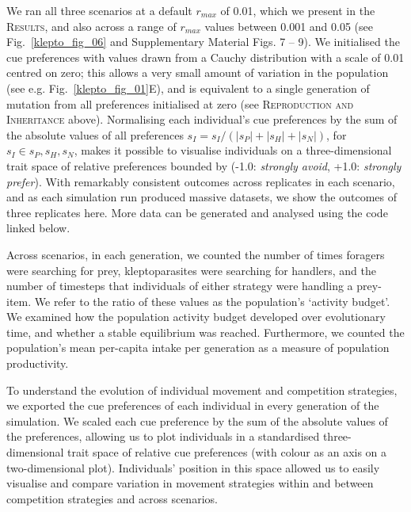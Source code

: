 We ran all three scenarios at a default $r_{max}$ of 0.01, which we present in the \textsc{Results}, and also across a range of $r_{max}$ values between 0.001 and 0.05 (see Fig.~\ref{klepto_fig_06} and Supplementary Material Figs. 7 -- 9).
We initialised the cue preferences with values drawn from a Cauchy distribution with a scale of 0.01 centred on zero; this allows a very small amount of variation in the population (see e.g. Fig.~\ref{klepto_fig_01}E), and is equivalent to a single generation of mutation from all preferences initialised at zero (see \textsc{Reproduction and Inheritance} above).
Normalising each individual's cue preferences by the sum of the absolute values of all preferences $s_I = s_I / (|s_P| + |s_H| + |s_N|)$, for $s_I \in s_P, s_H, s_N$, makes it possible to visualise individuals on a three-dimensional trait space of relative preferences bounded by (-1.0: \textit{strongly avoid}, +1.0: \textit{strongly prefer}).
With remarkably consistent outcomes across replicates in each scenario, and as each simulation run produced massive datasets, we show the outcomes of three replicates here.
More data can be generated and analysed using the code linked below.

Across scenarios, in each generation, we counted the number of times foragers were searching for prey, kleptoparasites were searching for handlers, and the number of timesteps that individuals of either strategy were handling a prey-item.
We refer to the ratio of these values as the population's `activity budget'.
We examined how the population activity budget developed over evolutionary time, and whether a stable equilibrium was reached.
Furthermore, we counted the population's mean per-capita intake per generation as a measure of population productivity.

To understand the evolution of individual movement and competition strategies, we exported the cue preferences of each individual in every generation of the simulation.
We scaled each cue preference by the sum of the absolute values of the preferences, allowing us to plot individuals in a standardised three-dimensional trait space of relative cue preferences (with colour as an axis on a two-dimensional plot).
Individuals' position in this space allowed us to easily visualise and compare variation in movement strategies within and between competition strategies and across scenarios.

